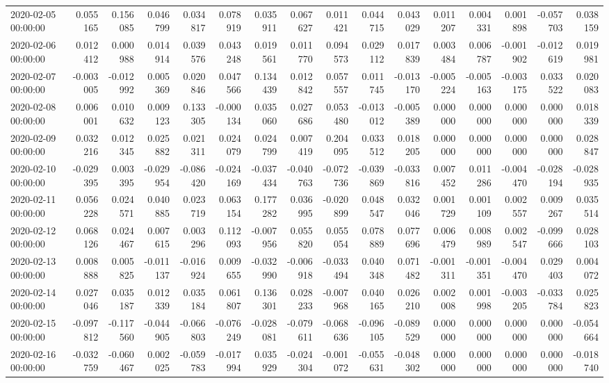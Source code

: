 \begin{tabular}{lrrrrrrrrrrrrrrr}
2020-02-05 00:00:00 & 0.055165 & 0.156085 & 0.046799 & 0.034817 & 0.078919 & 0.035911 & 0.067627 & 0.011421 & 0.044715 & 0.043029 & 0.011207 & 0.004331 & 0.001898 & -0.057703 & 0.038159 \\
2020-02-06 00:00:00 & 0.012412 & 0.000988 & 0.014914 & 0.039576 & 0.043248 & 0.019561 & 0.011770 & 0.094573 & 0.029112 & 0.017839 & 0.003484 & 0.006787 & -0.001902 & -0.012619 & 0.019981 \\
2020-02-07 00:00:00 & -0.003005 & -0.012992 & 0.005369 & 0.020846 & 0.047566 & 0.134439 & 0.012842 & 0.057557 & 0.011745 & -0.013170 & -0.005224 & -0.005163 & -0.003175 & 0.033522 & 0.020083 \\
2020-02-08 00:00:00 & 0.006001 & 0.010632 & 0.009123 & 0.133305 & -0.000134 & 0.035060 & 0.027686 & 0.053480 & -0.013012 & -0.005389 & 0.000000 & 0.000000 & 0.000000 & 0.000000 & 0.018339 \\
2020-02-09 00:00:00 & 0.032216 & 0.012345 & 0.025882 & 0.021311 & 0.024079 & 0.024799 & 0.007419 & 0.204095 & 0.033512 & 0.018205 & 0.000000 & 0.000000 & 0.000000 & 0.000000 & 0.028847 \\
2020-02-10 00:00:00 & -0.029395 & 0.003395 & -0.029954 & -0.086420 & -0.024169 & -0.037434 & -0.040763 & -0.072736 & -0.039869 & -0.033816 & 0.007452 & 0.011286 & -0.004470 & -0.028194 & -0.028935 \\
2020-02-11 00:00:00 & 0.056228 & 0.024571 & 0.040885 & 0.023719 & 0.063154 & 0.177282 & 0.036995 & -0.020899 & 0.048547 & 0.032046 & 0.001729 & 0.001109 & 0.002557 & 0.009267 & 0.035514 \\
2020-02-12 00:00:00 & 0.068126 & 0.024467 & 0.007615 & 0.003296 & 0.112093 & -0.007956 & 0.055820 & 0.055054 & 0.078889 & 0.077696 & 0.006479 & 0.008989 & 0.002547 & -0.099666 & 0.028103 \\
2020-02-13 00:00:00 & 0.008888 & 0.005825 & -0.011137 & -0.016924 & 0.009655 & -0.032990 & -0.006918 & -0.033494 & 0.040348 & 0.071482 & -0.001311 & -0.001351 & -0.004470 & 0.029403 & 0.004072 \\
2020-02-14 00:00:00 & 0.027046 & 0.035187 & 0.012339 & 0.035184 & 0.061807 & 0.136301 & 0.028233 & -0.007968 & 0.040165 & 0.026210 & 0.002008 & 0.001998 & -0.003205 & -0.033784 & 0.025823 \\
2020-02-15 00:00:00 & -0.097812 & -0.117560 & -0.044905 & -0.066803 & -0.076249 & -0.028081 & -0.079611 & -0.068636 & -0.096105 & -0.089529 & 0.000000 & 0.000000 & 0.000000 & 0.000000 & -0.054664 \\
2020-02-16 00:00:00 & -0.032759 & -0.060467 & 0.002025 & -0.059783 & -0.017994 & 0.035929 & -0.024304 & -0.001072 & -0.055631 & -0.048302 & 0.000000 & 0.000000 & 0.000000 & 0.000000 & -0.018740 \\

\end{tabular}
